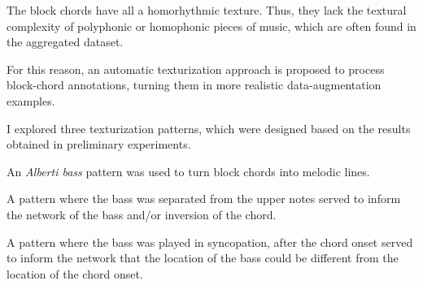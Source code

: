 
The block chords have all a homorhythmic texture. Thus, they
lack the textural complexity of polyphonic or homophonic
pieces of music, which are often found in the aggregated
dataset.

For this reason, an automatic texturization approach is
proposed to process block-chord annotations, turning them in
more realistic data-augmentation examples.

I explored three texturization patterns, which were designed
based on the results obtained in preliminary experiments. 


An \emph{Alberti bass} pattern was used to turn block chords
into melodic lines.


A pattern where the bass was separated from the upper notes
served to inform the network of the bass and/or inversion of
the chord.


A pattern where the bass was played in syncopation, after
the chord onset served to inform the network that the
location of the bass could be different from the location of
the chord onset.

